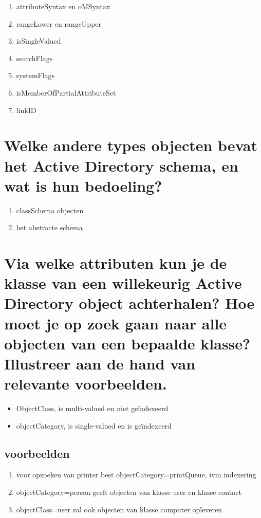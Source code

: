 \begin{enumerate}
	\item attributeSyntax en oMSyntax
	\item rangeLower en rangeUpper
	\item isSingleValued
	\item searchFlags
	\item systemFlags
	\item isMemberOfPartialAttributeSet
	\item linkID
\end{enumerate}

\section{Welke andere types objecten bevat het Active Directory schema, en wat
is hun bedoeling?}

\begin{enumerate}
	\item classSchema objecten
	\item het abstracte schema
\end{enumerate}

\section{Via welke attributen kun je de klasse van een willekeurig Active
	Directory object achterhalen? Hoe moet je op zoek gaan naar alle
	objecten van een bepaalde klasse? Illustreer aan de hand van relevante
voorbeelden.}

\begin{itemize}
	\item ObjectClass, is multi-valued en niet geïndexeerd
	\item objectCategory, is single-valued en is geïndexeerd
\end{itemize}

\subsection{voorbeelden}

\begin{enumerate}
	\item voor opzoeken van printer best objectCategory=printQueue, ivm indexering
	\item objectCategory=person geeft objecten van klasse user en klasse contact
	\item objectClass=user zal ook objecten van klasse computer opleveren
\end{enumerate}
